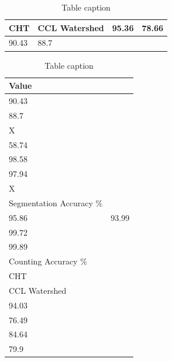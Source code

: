 \documentclass[conference]{IEEEtran}
\begin{document}
\begin{table}[htbp]
\centering
\caption{Counting Accuracy \%}
\label{tab:counting}
\begin{tabular}{llll}
\hline
CHT & CCL Watershed & 95.36 & 78.66 \\
\hline
90.43 & 88.7 & & \\
\hline
\end{tabular}

\begin{table}[htbp]
\centering
\caption{Table caption}
\label{tab:label}
\begin{tabular}{ll}
Value & \\
\hline
90.43 & \\
88.7 & \\
X & \\
58.74 & \\
98.58 & \\
97.94 & \\
X & \\
Segmentation Accuracy \% & \\
95.86 & 93.99 \\
99.72 & \\
99.89 & \\
Counting Accuracy \% & \\
CHT & \\
CCL Watershed & \\
94.03 & \\
76.49 & \\
84.64 & \\
79.9 & 
\end{tabular}
\end{table}


\end{table}
\end{document}
